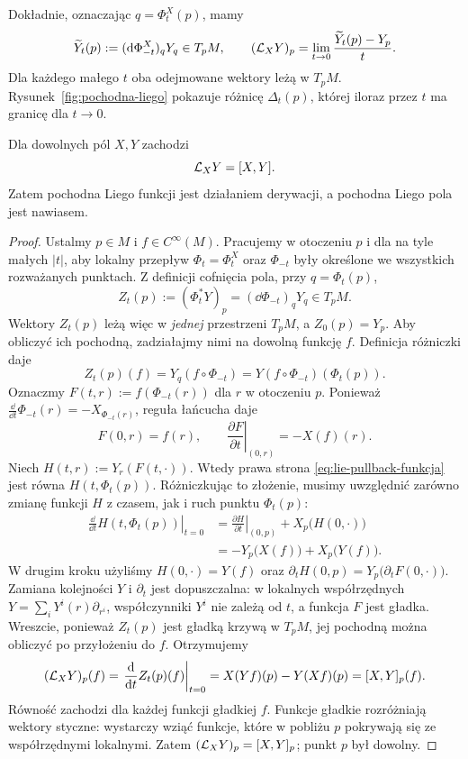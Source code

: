 Dokładnie, oznaczając $q=\Phi_t^X(p)$, mamy
\[
 \widetilde Y_t(p):=(\mathrm d\Phi_{-t}^X)_qY_q\in T_pM,\qquad
 (\mathcal L_XY)_p=\lim_{t\to0}\frac{\widetilde Y_t(p)-Y_p}{t}.
\]
Dla każdego małego $t$ oba odejmowane wektory leżą w $T_pM$.
Rysunek~\ref{fig:pochodna-liego} pokazuje różnicę $\Delta_t(p)$,
której iloraz przez $t$ ma granicę dla $t\to0$.


\begin{twierdzenie}\label{thm:lie-nawias}
Dla dowolnych pól $X,Y$ zachodzi
\begin{equation}\label{eq:lie-nawias}
 \mathcal L_XY=[X,Y].
\end{equation}
Zatem pochodna Liego funkcji jest działaniem derywacji,
a pochodna Liego pola jest nawiasem.
\end{twierdzenie}
\begin{proof}
Ustalmy $p\in M$ i $f\in C^\infty(M)$. Pracujemy w otoczeniu $p$
i dla na tyle małych $|t|$, aby lokalny przepływ $\Phi_t=\Phi_t^X$
oraz $\Phi_{-t}$ były określone we wszystkich rozważanych punktach.
Z definicji cofnięcia pola, przy $q=\Phi_t(p)$,
\[
 Z_t(p):=(\Phi_t^*Y)_p=(\dd\Phi_{-t})_qY_q\in T_pM.
\]
Wektory $Z_t(p)$ leżą więc w \emph{jednej} przestrzeni $T_pM$,
a $Z_0(p)=Y_p$. Aby obliczyć ich pochodną, zadziałajmy nimi
na dowolną funkcję $f$. Definicja różniczki daje
\begin{equation}\label{eq:lie-pullback-funkcja}
 Z_t(p)(f)
 =Y_q(f\circ\Phi_{-t})
 =Y(f\circ\Phi_{-t})(\Phi_t(p)).
\end{equation}
Oznaczmy $F(t,r):=f(\Phi_{-t}(r))$ dla $r$ w otoczeniu $p$.
Ponieważ $\frac{\dd}{\dd t}\Phi_{-t}(r)=-X_{\Phi_{-t}(r)}$,
reguła łańcucha daje
\[
 F(0,r)=f(r),\qquad
 \left.\frac{\partial F}{\partial t}\right|_{(0,r)}
 =-X(f)(r).
\]
Niech $H(t,r):=Y_r(F(t,\cdot))$. Wtedy prawa strona
\eqref{eq:lie-pullback-funkcja} jest równa $H(t,\Phi_t(p))$.
Różniczkując to złożenie, musimy uwzględnić zarówno zmianę
funkcji $H$ z czasem, jak i ruch punktu $\Phi_t(p)$:
\begin{align*}
 \left.\frac{\dd}{\dd t}H(t,\Phi_t(p))\right|_{t=0}
 &=\left.\frac{\partial H}{\partial t}\right|_{(0,p)}
   +X_p\bigl(H(0,\cdot)\bigr) \\
 &=-Y_p\bigl(X(f)\bigr)+X_p\bigl(Y(f)\bigr).
\end{align*}
W drugim kroku użyliśmy $H(0,\cdot)=Y(f)$ oraz
$\partial_tH(0,p)=Y_p\bigl(\partial_tF(0,\cdot)\bigr)$.
Zamiana kolejności $Y$ i $\partial_t$ jest dopuszczalna:
w lokalnych współrzędnych $Y=\sum_iY^i(r)\partial_{r^i}$,
współczynniki $Y^i$ nie zależą od $t$, a funkcja $F$ jest gładka.
Wreszcie, ponieważ $Z_t(p)$ jest gładką krzywą w $T_pM$,
jej pochodną można obliczyć po przyłożeniu do $f$. Otrzymujemy
\[
 (\mathcal L_XY)_p(f)
 =\left.\frac{\mathrm d}{\mathrm d t}Z_t(p)(f)\right|_{t=0}
 =X(Yf)(p)-Y(Xf)(p)=[X,Y]_p(f).
\]
Równość zachodzi dla każdej funkcji gładkiej $f$. Funkcje gładkie
rozróżniają wektory styczne: wystarczy wziąć funkcje, które
w pobliżu $p$ pokrywają się ze współrzędnymi lokalnymi.
Zatem $(\mathcal L_XY)_p=[X,Y]_p$; punkt $p$ był dowolny.
\end{proof}

